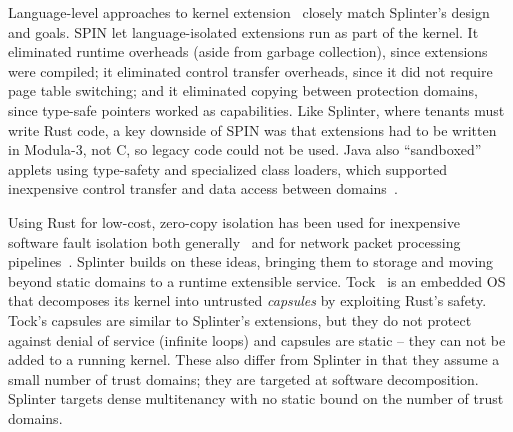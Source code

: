 Language-level approaches to kernel extension~\cite{spin,singularity} closely
match Splinter's design and goals. SPIN let language-isolated extensions run
as part of the kernel. It eliminated runtime overheads (aside from garbage
collection), since extensions were compiled; it eliminated control transfer
overheads, since it did not require page table switching; and it eliminated
copying between protection domains, since type-safe pointers worked as
capabilities.
Like Splinter, where tenants must write Rust code, a
key downside of SPIN was that extensions had
to be written in Modula-3, not C, so legacy code could not be used.
%
Java also ``sandboxed'' applets using type-safety and specialized class
loaders, which supported inexpensive control transfer and data access between
domains~\cite{extensible-java}.

Using Rust for low-cost, zero-copy isolation has been used for inexpensive
  software fault isolation both generally~\cite{rust-hotos-2016} and for
  network packet processing pipelines~\cite{netbricks-2016}.
Splinter builds on these ideas, bringing them to storage and moving beyond
  static domains to a runtime extensible service.
Tock~\cite{tockos-2017} is an embedded OS that decomposes its kernel into
  untrusted \textsl{capsules} by exploiting Rust's safety. Tock's capsules
  are similar to Splinter's extensions, but they do not protect against denial of
  service (infinite loops) and capsules are static -- they can not be added to a running kernel.
These also differ from Splinter in that they assume a small number of trust
  domains; they are targeted at software decomposition.
Splinter targets dense multitenancy with no static
  bound on the number of trust domains.


